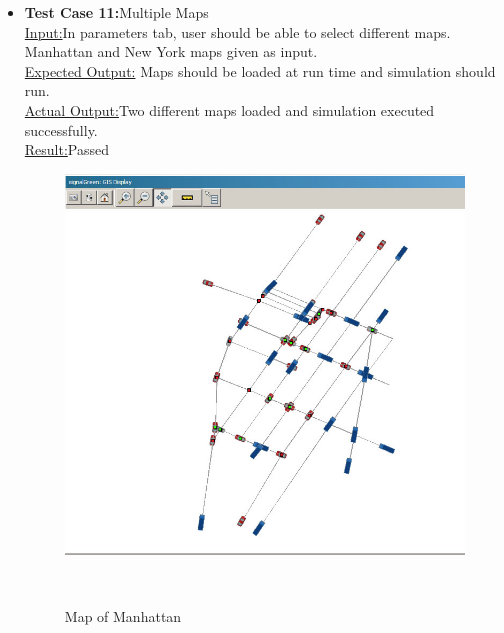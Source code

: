 \documentclass[11pt]{article}
\begin{document}
\begin{itemize}
\begin{itemize}
		
		\item \textbf{Test Case 11:}Multiple Maps\hfill \\
		\underline{Input:}In parameters tab, user should be able to select different maps. Manhattan and New York maps given as input.  \hfill \\
		\underline{Expected Output:} Maps should be loaded at run time and simulation should run.\hfill \\
		\underline{Actual Output:}Two different maps loaded and simulation executed successfully.\hfill \\
		\underline{Result:}Passed
		\begin{figure}[h]
		\begin{center}
		\includegraphics[scale=0.3]{manhattan_section}
		\caption{Map of Manhattan}\hfill \\
		\end{center}
		\end{figure}
		

\end{itemize}
\end{itemize}
\end{document}
